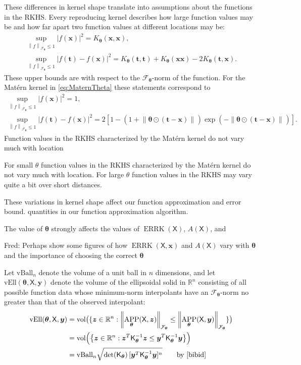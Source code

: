 \documentclass[]{mcom-l}
\theoremstyle{theorem}
\theoremstyle{remark}
\newcommand{\vBall}{\text{vBall}_n}
\newcommand{\vEll}{\text{vEll}}
\DeclareMathOperator{\vol}{vol}
\DeclareMathOperator{\errK}{ERRK}
\DeclareMathOperator{\APP}{APP}
\newcommand{\reals}{{\mathbb{R}}}
\newcommand{\mK}{\mathsf{K}}
\newcommand{\mX}{\mathsf{X}}
\newcommand{\bx}{{\boldsymbol{x}}}
\newcommand{\by}{{\boldsymbol{y}}}
\newcommand{\bt}{{\boldsymbol{t}}}
\newcommand{\bz}{{\boldsymbol{z}}}
\newcommand{\btheta}{{\boldsymbol{\theta}}}
\newcommand{\calf}{{\mathcal{F}}}
\def\abs#1{\ensuremath{\left \lvert #1 \right \rvert}}
\newcommand{\norm}[2][{}]{\ensuremath{\left \lVert #2 \right \rVert}_{#1}}
\newcommand{\FredNote}[1]{{\color{blue}Fred: #1}}
\begin{document}
These differences in kernel shape translate into assumptions about the functions in the RKHS.  Every reproducing kernel describes how large function values may be and how far apart two function values at different locations may be:
\begin{subequations} \label{eq:diff_f}
\begin{gather}
\sup_{\norm[\calf_{\btheta}]{f} \le 1} \abs{f(\bx)}^2 = K_\btheta(\bx,\bx), \\   
\sup_{\norm[\calf_{\btheta}]{f} \le 1} \abs{f(\bt) - f(\bx)}^2 = K_{\btheta}(\bt,\bt) +  K_{\btheta}(\bx\bx) - 2 K_{\btheta}(\bt,\bx).
\end{gather}
\end{subequations}
These upper bounds are with respect to the $\calf_\btheta$-norm of the function.  For the Mat\'ern kernel in \eqref{eq:MaternTheta} these statements correspond to 
\begin{subequations} \label{eq:diff_f_Matern}
	\begin{gather}
\sup_{\norm[\calf_{\btheta}]{f} \le 1} \abs{f(\bx)}^2 = 1, \\ 
\sup_{\norm[\calf_{\btheta}]{f} \le 1} \abs{f(\bt) - f(\bx)}^2 = 2[1 - (1 +  \norm{\btheta \odot (\bt-\bx)}) \exp(-\norm{\btheta \odot (\bt-\bx)})].
\end{gather}
\end{subequations}
Function values in the RKHS characterized by the Mat\'ern kernel do not vary much with location 


For small $\theta$ function values in the RKHS characterized by the Mat\'ern kernel do not vary much with location. For large $\theta$ function values in the RKHS may vary quite a bit over short distances.

These variations in kernel shape affect our function approximation and error bound. quantities in our function approximation algorithm.


The value of $\btheta$ strongly affects the values of $\errK(\mX)$, $A(\mX)$, and 

\FredNote{Perhaps show some figures of how $\errK(\mX,\bx)$ and $A(\mX)$ vary with $\btheta$ and the importance of choosing the correct $\btheta$}

Let $\vBall$ denote the volume of a unit ball in $n$ dimensions, and let $\vEll(\btheta,\mX,\by)$ denote the volume of the ellipsoidal solid in $\reals^n$ consisting of all possible function data whose minimum-norm interpolants have an $\calf_{\btheta}$-norm no greater than that of the observed interpolant:
\begin{align*}
\vEll(\btheta,\mX,\by) &= \vol\bigl(\{ \bz \in \reals^n : \norm[\calf_{\btheta}]{\APP_{\btheta}(\mX,\bz)}  \le \norm[\calf_{\btheta}]{\APP_{\btheta}(\mX,\by)} \} \bigr) \\
& = \vol\Bigl( \bigl \{ \bz \in \reals^n : \bz^T \mK_\btheta^{-1} \bz \le \by^T \mK_\btheta^{-1} \by  \bigr \} \Bigr) \\
& = \vBall \sqrt{\det(\mK_{\btheta})  \, [\by^T \mK_\btheta^{-1} \by]^n } \qquad \text{by \cite{bibid}}
\end{align*}
\end{document}
